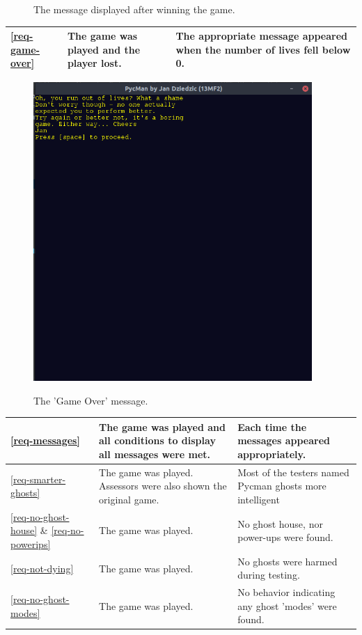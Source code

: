 \documentclass[11pt,a4paper,notitlepage]{report}
\newenvironment{img}{
	\begin{center}
		\begin{figure}[H]
			\begin{center}
			
}{
	\end{center}
		\end{figure}
			\end{center}
}
\begin{document}
\begin{center}
\begin{img}
					\caption{The message displayed after winning the game.}
				\end{img}
				\begin{longtable}{ | p{2cm} | p{5cm} | p{4cm} |}
					\hline	
					\ref{req-game-over}&The game was played and the player lost.&The appropriate message appeared when the number of lives fell below 0.\\ \hline
				\end{longtable}
				\begin{img}
					\includegraphics[width=300pt]{images/game_over_msg.png}\\
					\caption{The 'Game Over' message.}
				\end{img}
				\begin{longtable}{ | p{2cm} | p{5cm} | p{4cm} |}
					\hline	
					\ref{req-messages}&The game was played and all conditions to display all messages were met.&Each time the messages appeared appropriately.\\ \hline
					\ref{req-smarter-ghosts}&The game was played. Assessors were also shown the original game.&Most of the testers named Pycman ghosts more intelligent\\ \hline
					\ref{req-no-ghost-house} \& \ref{req-no-powerips}&The game was played.&No ghost house, nor power-ups were found.\\ \hline
					\ref{req-not-dying}&The game was played.&No ghosts were harmed during testing.\\ \hline
					\ref{req-no-ghost-modes}&The game was played.&No behavior indicating any ghost 'modes' were found.\\ \hline

\end{longtable}
\end{center}
\end{document}
